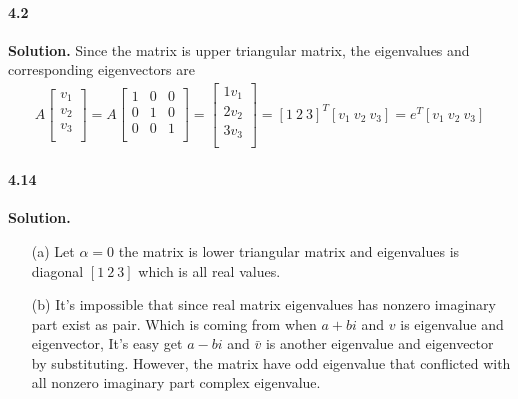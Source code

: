 \documentclass[a4paper]{book}
\newenvironment{solution}%
{\noindent\textbf{Solution.}}%
{\qedhere}
\numberwithin{equation}{chapter}
\theoremstyle{definition}
\begin{document}
\paragraph*{4.2 }
\begin{solution}
    Since the matrix is upper triangular matrix, the eigenvalues
    and corresponding eigenvectors are 
    \begin{align*}
        A \left[\begin{array}{c}
            v_1 \\
            v_2 \\ 
            v_3\\
        \end{array}\right] = A \left[ \begin{array}{ccc}
            1& 0 & 0 \\
            0& 1 & 0 \\
            0 & 0 & 1 \\
        \end{array}\right] = 
        \left[\begin{array}{c}
            1 v_1 \\
            2 v_2\\ 
            3 v_3\\
        \end{array}\right]
        = [1\ 2\ 3]^T [v_1\ v_2\ v_3] = e^T [v_1\ v_2\ v_3]
    \end{align*}
\end{solution}

\paragraph*{4.14 }
\begin{solution}
    \begin{itemize}
        \item [(a)] Let $\alpha = 0$ the matrix is lower 
        triangular matrix and eigenvalues is diagonal $[1\ 2\ 3]$
        which is all real values.
        
        \item [(b)] It's impossible that since real matrix eigenvalues 
        has nonzero imaginary part exist as pair. Which is coming from when 
        $a + bi$ and $v$ is eigenvalue and eigenvector, It's easy get 
        $a - bi$ and $\bar{v}$ is another eigenvalue and eigenvector
        by substituting.
        However, the matrix have odd eigenvalue that conflicted with 
        all nonzero imaginary part complex eigenvalue.
    \end{itemize}
\end{solution}
\end{document}
